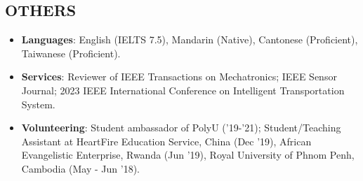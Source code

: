 \documentclass[overlapped]{res}
\begin{document}
\begin{resume}


\section{OTHERS}
\begin{itemize}
  \item \textbf{Languages}: English (IELTS 7.5), Mandarin (Native), Cantonese (Proficient), Taiwanese (Proficient).
  \item \textbf{Services}: Reviewer of IEEE Transactions on Mechatronics; IEEE Sensor Journal; 2023 IEEE International Conference on Intelligent Transportation System.
  \item \textbf{Volunteering}: Student ambassador of PolyU ('19-'21); Student/Teaching Assistant at HeartFire Education Service, China (Dec '19), African Evangelistic Enterprise, Rwanda (Jun '19), Royal University of Phnom Penh, Cambodia (May - Jun '18).
\end{itemize}





\end{resume}
\end{document}
